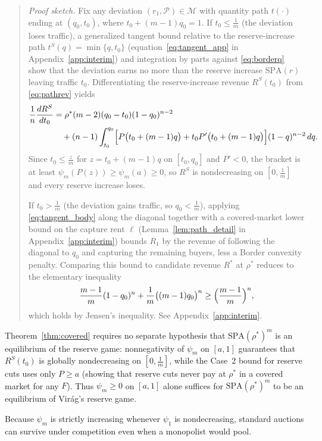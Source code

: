 \documentclass[12pt]{article}
\theoremstyle{mystyle}
\theoremstyle{mystyle2}
\newenvironment{sketch}{\begin{quote}\small\noindent\textit{Proof sketch.}}{\end{quote}}
\newcommand{\M}{\mathcal{M}}
\newcommand{\cP}{\mathcal{P}}
\newcommand{\SPA}{\mathrm{SPA}}
\newcommand{\1}{\mathbf{1}}
\begin{document}
\begin{sketch}
Fix any deviation $(r_1,\cP)\in\M$ with quantity path $t(\cdot)$ ending at $(q_0,t_0)$, where $t_0+(m-1)q_0=1$. If $t_0\le\frac{1}{m}$ (the deviation loses traffic), a generalized tangent bound relative to the reserve-increase path $t^S(q)=\min\{q,t_0\}$ (equation~\eqref{eq:tangent_app} in Appendix~\ref{app:interim}) and integration by parts against \eqref{eq:borderq} show that the deviation earns no more than the reserve increase $\SPA(r)$ leaving traffic $t_0$. Differentiating the reserve-increase revenue $R^S(t_0)$ from \eqref{eq:pathrev} yields
\begin{align*}
\frac{1}{n}\frac{dR^S}{dt_0} &= \rho^*(m-2)(q_0-t_0)(1-q_0)^{n-2} \\
&\quad + (n-1)\int_{t_0}^{q_0}\Bigl[P\bigl(t_0+(m-1)q\bigr)+t_0 P'\bigl(t_0+(m-1)q\bigr)\Bigr](1-q)^{n-2}\,dq.
\end{align*}
Since $t_0\le \frac{z}{m}$ for $z=t_0+(m-1)q$ on $[t_0,q_0]$ and $P'<0$, the bracket is at least $\psi_m(P(z))\ge\psi_m(a)\ge 0$, so $R^S$ is nondecreasing on $[0,\frac{1}{m}]$ and every reserve increase loses.

If $t_0>\frac{1}{m}$ (the deviation gains traffic, so $q_0<\frac{1}{m}$), applying \eqref{eq:tangent_body} along the diagonal together with a covered-market lower bound on the capture rent $\ell$ (Lemma~\ref{lem:path_detail} in Appendix~\ref{app:interim}) bounds $R_1$ by the revenue of following the diagonal to $q_0$ and capturing the remaining buyers, less a Border convexity penalty. Comparing this bound to candidate revenue $R^*$ at $\rho^*$ reduces to the elementary inequality
\[
\frac{m-1}{m}(1-q_0)^n + \frac{1}{m}\bigl((m-1)q_0\bigr)^n \ge \Bigl(\frac{m-1}{m}\Bigr)^n,
\]
which holds by Jensen's inequality. See Appendix~\ref{app:interim}.
\end{sketch}

Theorem~\ref{thm:covered} requires no separate hypothesis that $\SPA(\rho^*)^m$ is an equilibrium of the reserve game: nonnegativity of $\psi_m$ on $[a,1]$ guarantees that $R^S(t_0)$ is globally nondecreasing on $[0,\frac{1}{m}]$, while the Case~2 bound for reserve cuts uses only $P\ge a$ (showing that reserve cuts never pay at $\rho^*$ in a covered market for any $F$). Thus $\psi_m\ge 0$ on $[a,1]$ alone suffices for $\SPA(\rho^*)^m$ to be an equilibrium of Vir\'ag's reserve game.

Because $\psi_m$ is strictly increasing whenever $\psi_1$ is nondecreasing, standard auctions can survive under competition even when a monopolist would pool.
\end{document}
